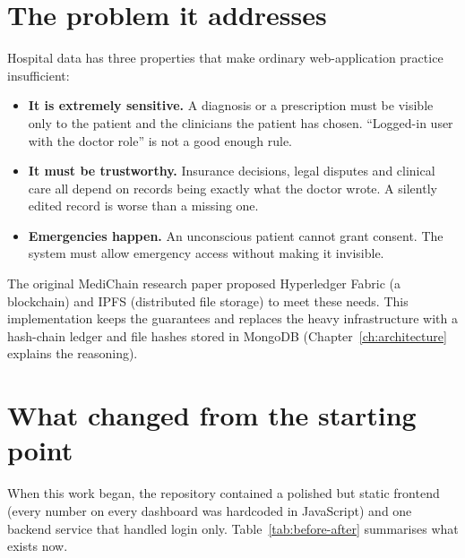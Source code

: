 \section{The problem it addresses}

Hospital data has three properties that make ordinary web-application practice
insufficient:

\begin{itemize}
  \item \textbf{It is extremely sensitive.} A diagnosis or a prescription must be
    visible only to the patient and the clinicians the patient has chosen.
    ``Logged-in user with the doctor role'' is not a good enough rule.
  \item \textbf{It must be trustworthy.} Insurance decisions, legal disputes and
    clinical care all depend on records being exactly what the doctor wrote. A
    silently edited record is worse than a missing one.
  \item \textbf{Emergencies happen.} An unconscious patient cannot grant consent.
    The system must allow emergency access without making it invisible.
\end{itemize}

The original MediChain research paper proposed Hyperledger Fabric (a blockchain)
and IPFS (distributed file storage) to meet these needs. This implementation
keeps the guarantees and replaces the heavy infrastructure with a hash-chain
ledger and file hashes stored in MongoDB (Chapter~\ref{ch:architecture} explains
the reasoning).

\section{What changed from the starting point}

When this work began, the repository contained a polished but static frontend
(every number on every dashboard was hardcoded in JavaScript) and one backend
service that handled login only. Table~\ref{tab:before-after} summarises what
exists now.

